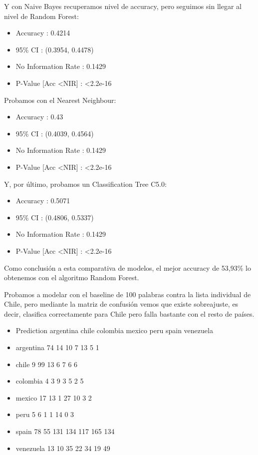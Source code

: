 \documentclass[11pt,a4paper]{article}
\begin{document}
Y con Naive Bayes recuperamos nivel de accuracy, pero seguimos sin llegar al nivel de Random Forest: 

\begin{itemize}
    \item Accuracy : 0.4214  
    \item 95\% CI : (0.3954, 0.4478)
    \item No Information Rate : 0.1429 
    \item P-Value [Acc \textless NIR] :  \textless  2.2e-16
\end{itemize}


Probamos con el Nearest Neighbour:

\begin{itemize}
    \item Accuracy : 0.43 
    \item 95\% CI : (0.4039, 0.4564)
    \item No Information Rate : 0.1429 
    \item P-Value [Acc \textless NIR] :  \textless  2.2e-16
\end{itemize}


Y, por último, probamos un Classification Tree C5.0:

\begin{itemize}
    \item Accuracy : 0.5071
    \item 95\% CI : (0.4806, 0.5337)
    \item No Information Rate : 0.1429  
    \item P-Value [Acc \textless NIR] :  \textless  2.2e-16
\end{itemize}

Como conclusi\'on a esta comparativa de modelos, el mejor accuracy de 53,93\% lo obtenemos con el algoritmo Random Forest.

Probamos a modelar con el baseline de 100 palabras contra la lista individual de Chile, pero mediante la matriz de confusi\'on vemos que existe sobreajuste, es decir, clasifica correctamente para Chile pero falla bastante con el resto de pa\'ises.


\begin{itemize}
    \item Prediction  argentina chile colombia mexico peru spain venezuela
    \item argentina        74    14       10      7   13     5         1
    \item chile             9    99       13      6    7     6         6 
    \item colombia          4     3        9      3    5     2         5
    \item mexico           17    13        1     27   10     3         2
    \item peru              5     6        1      1   14     0         3
    \item spain            78    55      131    134  117   165       134
    \item venezuela        13    10       35     22   34    19        49
\end{itemize}
\end{document}
